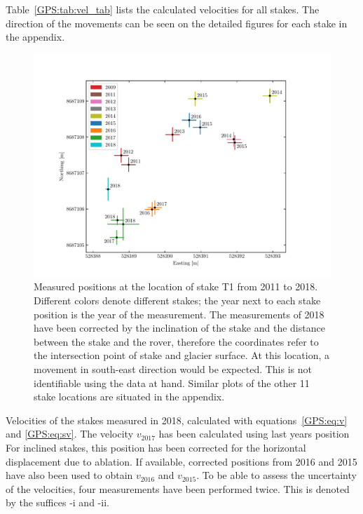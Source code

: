 Table~\ref{GPS:tab:vel_tab} lists the calculated velocities for all stakes.
The direction of the movements can be seen on the detailed figures for each stake in the appendix.


\begin{figure}[H]
    \centering
    \includegraphics[width=\textwidth]{./figs/T1_2d.pdf}
    \caption{Measured positions at the location of stake T1 from 2011 to 2018.
    Different colors denote different stakes;
  	the year next to each stake position is the year of the measurement.
  	The measurements of 2018 have been corrected by the inclination of the stake and
  	the distance between the stake and the rover, therefore the coordinates refer to the intersection point
  	of stake and glacier surface.
    	At this location, a movement in south-east direction would be expected.
    	This is not identifiable using the data at hand.
 	Similar plots of the other 11 stake locations are situated in the appendix.}
    \label{GPS:fig:T1_2d}
\end{figure}


\begin{table}[h]
	\caption{Velocities of the stakes measured in 2018, calculated with equations~\ref{GPS:eq:v} and \ref{GPS:eq:sv}.
	The velocity $v_{2017}$ has been calculated using last years position
	For inclined stakes, this position has been corrected for the horizontal displacement due to ablation.
	If available, corrected positions from 2016 and 2015 have also been used to obtain $v_{2016}$ and $v_{2015}$.
	To be able to assess the uncertainty of the velocities, four measurements have been performed twice.
	This is denoted by the suffices -i and -ii.}
	\centering
	
	\label{GPS:tab:vel_tab}
\end{table}

